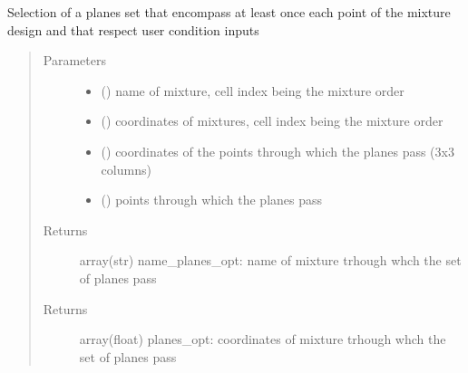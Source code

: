 \documentclass[letterpaper,10pt,english]{sphinxmanual}
\begin{document}
\begin{fulllineitems}
\label{\detokenize{ExperimentsPlannification:modules.planes_set}}
\sphinxAtStartPar
Selection of a planes set that encompass at least once  each point of the mixture design and that respect user condition inputs
\begin{quote}\begin{description}
\item[{Parameters}] \leavevmode\begin{itemize}
\item {} 
\sphinxAtStartPar
{} () \textendash{} name of mixture, cell index being the mixture order

\item {} 
\sphinxAtStartPar
{} () \textendash{} coordinates of mixtures, cell index being the mixture order 

\item {} 
\sphinxAtStartPar
{} () \textendash{} coordinates of the points through which the planes pass (3x3 columns)

\item {} 
\sphinxAtStartPar
{} () \textendash{} points through which the planes pass

\end{itemize}

\item[{Returns}] \leavevmode
\sphinxAtStartPar
array(str) name\_planes\_opt: name of mixture trhough whch the set of planes pass

\item[{Returns}] \leavevmode
\sphinxAtStartPar
array(float) planes\_opt: coordinates of mixture trhough whch the set of planes pass

\end{description}\end{quote}

\end{fulllineitems}
\end{document}
